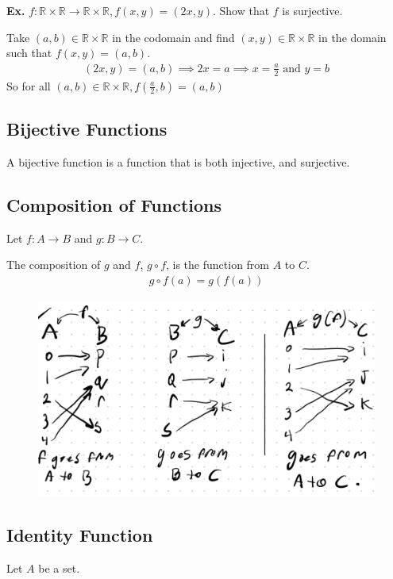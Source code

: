 \documentclass[12pt,letterpaper]{article} \usepackage{amsmath} \usepackage{graphicx}  \usepackage{longtable}  \usepackage{amssymb}
\begin{document}
        \begin{mdframed}
            \textbf{Ex. } $f: \mathbb{R}\times \mathbb{R} \rightarrow \mathbb{R}\times \mathbb{R}, f(x,y) = (2x,y)$. Show that $f$ is surjective. 

            Take $(a,b) \in \mathbb{R}\times\mathbb{R}$ in the codomain and find $(x,y)\in\mathbb{R}\times\mathbb{R}$ in the domain such that $f(x,y)=(a,b)$.
            \begin{align*}
                (2x,y) = (a,b) \implies 2x = a \implies x= \frac{a}{2} \text{ and } y=b
            \end{align*}
            So for all $(a,b)\in \mathbb{R}\times \mathbb{R}, f(\frac{a}{2},b) = (a,b)$
        \end{mdframed}

        \subsection{Bijective Functions}
        A bijective function is a function that is both injective, and surjective. 

        \subsection{Composition of Functions}
        Let $f: A\to B$ and $g:B \to C$.
        
        The composition of $g$ and $f$, $g\circ f$, is the function from $A$ to $C$.
        \begin{align*}
            g\circ f(a) = g(f(a))
        \end{align*}
        \begin{figure}[H]
            \centering
            \includegraphics[width=0.6\linewidth]{composition-of-functions.png}
        \end{figure}

        \subsection{Identity Function}
        Let $A$ be a set. 
        
\end{document}
